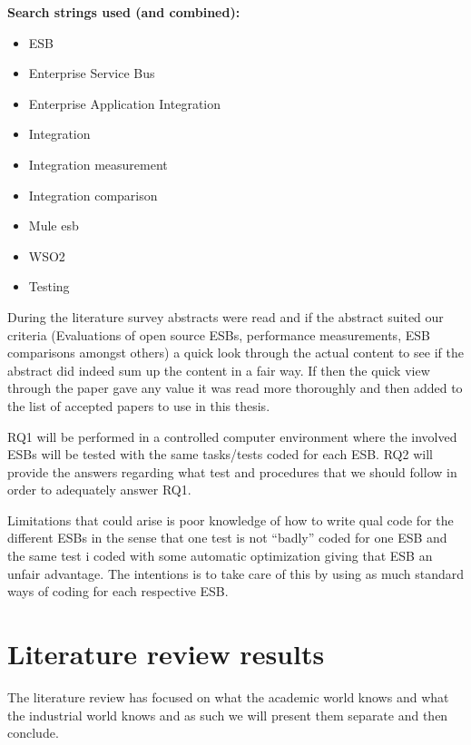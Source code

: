 \documentclass{llncs}
\begin{document}
{\bf Search strings used (and combined):}
\begin{itemize}
	\item ESB
	\item Enterprise Service Bus
	\item Enterprise Application Integration
	\item Integration
	\item Integration measurement
	\item Integration comparison
	\item Mule esb
	\item WSO2
	\item Testing
\end{itemize}

During the literature survey abstracts were read and if the abstract suited our criteria (Evaluations of open source ESBs, performance measurements, ESB comparisons amongst others) a quick look through the actual content to see if the abstract did indeed sum up the content in a fair way. If then the quick view through the paper gave any value it was read more thoroughly and then added to the list of accepted papers to use in this thesis.


RQ1 will be performed in a controlled computer environment where the involved ESBs will be tested with the same tasks/tests coded for each ESB.
RQ2 will provide the answers regarding what test and procedures that we should follow in order to adequately answer RQ1.


Limitations that could arise is poor knowledge of how to write qual code for the different ESBs in the sense that one test is not ``badly'' coded for one ESB and the same test i coded with some automatic optimization giving that ESB an unfair advantage. The intentions is to take care of this by using as much standard ways of coding for each respective ESB.

\label{sec:method}
\section{Literature review results}
\label{sec:litrev}

The literature review has focused on what the academic world knows and what the industrial world knows and as such we will present them separate and then conclude.
\end{document}
